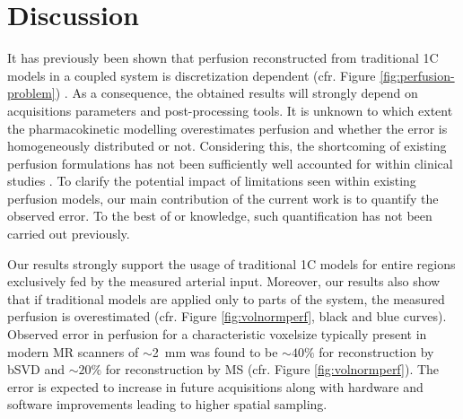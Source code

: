 \documentclass[final,5p,times,twocolumn]{elsarticle}
\begin{document}
	
	
	\section{Discussion}\label{sec:conclusion}

It has previously been shown that perfusion reconstructed from traditional 1C models in a coupled system is discretization dependent (cfr. Figure \ref{fig:perfusion-problem}) \cite{Henkelman1990,Guibert2013,sourbron14}. As a consequence, the obtained results will strongly depend on acquisitions parameters and post-processing tools. It is unknown to which extent the pharmacokinetic modelling overestimates perfusion and whether the error is homogeneously distributed or not. Considering this, the shortcoming of existing perfusion formulations has not been sufficiently well accounted for within clinical studies \cite{Mokin16,Kickingereder15}. To clarify the potential impact of limitations seen within existing perfusion models, our main contribution of the current work is to quantify the observed error. To the best of or knowledge, such quantification has not been carried out previously.

	Our results strongly support the usage of traditional 1C models for entire regions exclusively fed by the measured arterial input. Moreover, our results also show that if traditional models are applied only to parts of the system, the measured perfusion is overestimated (cfr. Figure \ref{fig:volnormperf}, black and blue curves). Observed error in perfusion for a characteristic voxelsize typically present in modern MR scanners of $\sim$\SI{2}{\milli\meter} was found to be $\sim$$40\%$ for reconstruction by bSVD and $\sim$$20\%$ for reconstruction by MS (cfr. Figure \ref{fig:volnormperf}). The error is expected to increase in future acquisitions along with hardware and software improvements leading to higher spatial sampling.
		
\end{document}

